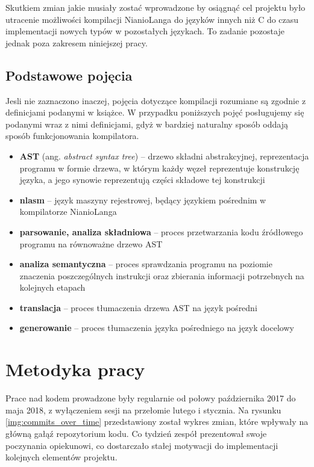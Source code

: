 \documentclass[licencjacka]{pracamgr}
\begin{document}
Skutkiem zmian jakie musiały zostać wprowadzone by osiągnąć cel projektu było utracenie możliwości
kompilacji NianioLanga do języków innych niż C do czasu implementacji nowych typów w pozostałych językach.
To zadanie pozostaje jednak poza zakresem niniejszej pracy.

\section{Podstawowe pojęcia}
Jesli nie zaznaczono inaczej, pojęcia dotyczące kompilacji rozumiane są zgodnie z definicjami
podanymi w książce\cite{dragonbook}. W przypadku poniższych pojęć posługujemy się podanymi wraz z nimi definicjami, gdyż w bardziej naturalny sposób oddają sposób funkcjonowania kompilatora.
\begin{itemize}
  \item[] \textbf{AST} (ang. \textit{abstract syntax tree}) -- drzewo składni abstrakcyjnej,
    reprezentacja programu w formie drzewa, w którym każdy węzeł
    reprezentuje konstrukcję języka, a jego synowie reprezentują części składowe tej konstrukcji
  \item[] \textbf{nlasm} -- język maszyny rejestrowej, będący językiem pośrednim w kompilatorze NianioLanga
  \item[] \textbf{parsowanie, analiza składniowa} -- proces przetwarzania kodu źródłowego programu na równoważne drzewo
  AST
  \item[] \textbf{analiza semantyczna} -- proces sprawdzania programu na poziomie znaczenia poszczególnych instrukcji
  oraz zbierania informacji potrzebnych na kolejnych etapach
  \item[] \textbf{translacja} -- proces tłumaczenia drzewa AST na język pośredni
  \item[] \textbf{generowanie} -- proces tłumaczenia języka pośredniego na język docelowy
\end{itemize}

\chapter{Metodyka pracy}
Prace nad kodem prowadzone były regularnie od połowy października 2017 do maja 2018,
z wyłączeniem sesji na przełomie lutego i stycznia. Na rysunku \ref{img:commits_over_time}
przedstawiony został wykres zmian, które wpływały na główną gałąź repozytorium kodu.
Co tydzień zespół prezentował swoje poczynania opiekunowi, co dostarczało stałej motywacji
do implementacji kolejnych elementów projektu.
\end{document}
